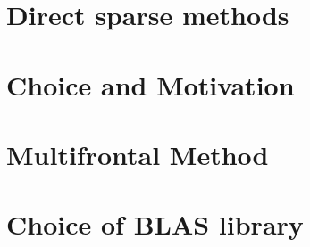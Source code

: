 \section{Direct sparse methods}
\label{subseq:sparse methods}








\section{Choice and Motivation}
\label{subseq:choice and motivation}



\section{Multifrontal Method}
\label{subseq:multifrontal method}

\section{Choice of BLAS library}
\label{subseq:blas-comparison}

